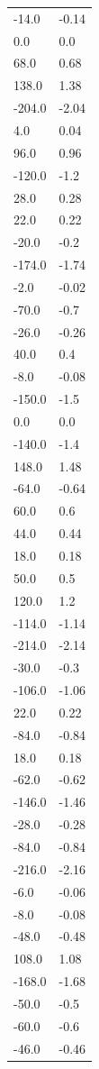\begin{longtable}{ll}
-14.0 & -0.14 \\
0.0 & 0.0 \\
68.0 & 0.68 \\
138.0 & 1.38 \\
-204.0 & -2.04 \\
4.0 & 0.04 \\
96.0 & 0.96 \\
-120.0 & -1.2 \\
28.0 & 0.28 \\
22.0 & 0.22 \\
-20.0 & -0.2 \\
-174.0 & -1.74 \\
-2.0 & -0.02 \\
-70.0 & -0.7 \\
-26.0 & -0.26 \\
40.0 & 0.4 \\
-8.0 & -0.08 \\
-150.0 & -1.5 \\
0.0 & 0.0 \\
-140.0 & -1.4 \\
148.0 & 1.48 \\
-64.0 & -0.64 \\
60.0 & 0.6 \\
44.0 & 0.44 \\
18.0 & 0.18 \\
50.0 & 0.5 \\
120.0 & 1.2 \\
-114.0 & -1.14 \\
-214.0 & -2.14 \\
-30.0 & -0.3 \\
-106.0 & -1.06 \\
22.0 & 0.22 \\
-84.0 & -0.84 \\
18.0 & 0.18 \\
-62.0 & -0.62 \\
-146.0 & -1.46 \\
-28.0 & -0.28 \\
-84.0 & -0.84 \\
-216.0 & -2.16 \\
-6.0 & -0.06 \\
-8.0 & -0.08 \\
-48.0 & -0.48 \\
108.0 & 1.08 \\
-168.0 & -1.68 \\
-50.0 & -0.5 \\
-60.0 & -0.6 \\
-46.0 & -0.46 \\

\end{longtable}
